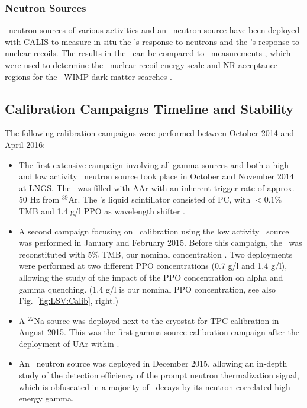 \subsubsection{Neutron Sources}
\AmBe\ neutron sources of various activities and an \AmC\ neutron source have been deployed with CALIS to measure in-situ the \lsv's response to neutrons and the \tpc's response to nuclear recoils. The results in the \tpc\ can be compared to \SCENE\ measurements \cite{Alexander:2013ke, Cao:2015ks}, which were used to determine the \tpc\ nuclear recoil energy scale and NR acceptance regions for the \dsf\ WIMP dark matter searches \cite{Agnes:2015gu, Agnes:2015_uar}.

\subsection{Calibration Campaigns Timeline and Stability}
The following calibration campaigns were performed between October 2014 and April 2016:
\begin{itemize}
\item The first extensive campaign involving all gamma sources and both a high and low activity \AmBe\ neutron source took place in October and November 2014 at LNGS. The \tpc\ was filled with AAr with an inherent trigger rate of approx. 50 Hz from $^{39}$Ar. The \lsv's liquid scintillator consisted of PC, with $<0.1 \%$ TMB and 1.4 g/l PPO as wavelength shifter \cite{Agnes:2015qyz}.

\item A second campaign focusing on \lsv\ calibration using the low activity \AmBe\ source was performed in January and February 2015. Before this campaign, the \lsv\ was reconstituted with 5\% TMB, our nominal concentration \cite{Agnes:2015qyz}. Two deployments were performed at two different PPO concentrations (0.7 g/l and 1.4 g/l), allowing the study of the impact of the PPO concentration on alpha and gamma quenching. (1.4 g/l is our nominal PPO concentration, see also Fig.~\ref{fig:LSV:Calib}, right.)
\item A $^{22}$Na source was deployed next to the cryostat for TPC calibration in August 2015. This was the first gamma source calibration campaign after the deployment of UAr within \dsf.
\item An \AmC\ neutron source was deployed in December 2015, allowing an in-depth study of the detection efficiency of the prompt neutron thermalization signal, which is obfuscated in a majority of \AmBe\ decays by its neutron-correlated high energy gamma.
\end{itemize}

